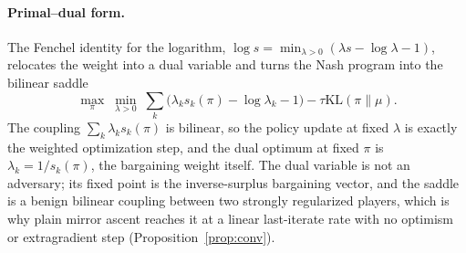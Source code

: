 \documentclass[letterpaper]{article} %
\newcommand{\KL}{\mathrm{KL}}
\begin{document}
\paragraph{Primal--dual form.}
The Fenchel identity for the logarithm, $\log s=\min_{\lambda>0}(\lambda s-\log\lambda-1)$, relocates the weight into a dual variable and turns the Nash program into the bilinear saddle
\begin{equation}
\max_{\pi}\;\min_{\lambda>0}\;\sum_{k}\big(\lambda_ks_k(\pi)-\log\lambda_k-1\big)-\tau\KL(\pi\|\mu).
\label{eq:saddle}
\end{equation}
The coupling $\sum_k\lambda_ks_k(\pi)$ is bilinear, so the policy update at fixed $\lambda$ is exactly the weighted optimization step, and the dual optimum at fixed $\pi$ is $\lambda_k=1/s_k(\pi)$, the bargaining weight itself. The dual variable is not an adversary; its fixed point is the inverse-surplus bargaining vector, and the saddle is a benign bilinear coupling between two strongly regularized players, which is why plain mirror ascent reaches it at a linear last-iterate rate with no optimism or extragradient step (Proposition~\ref{prop:conv}).
\end{document}
